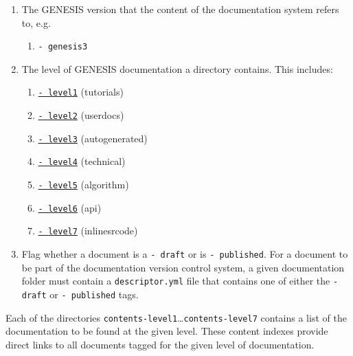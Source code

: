 \documentclass[12pt]{article}
\begin{document}
\begin{enumerate}

\item The GENESIS version that the content of the documentation system refers to, e.g.
\begin{enumerate}
\item  {\tt - genesis3}
\end{enumerate}

\item The level of GENESIS documentation a directory contains. This includes:

	\begin{enumerate}

	\item \href{../contents-level1/contents-level1.pdf}{{\tt - level1}} (tutorials)

	\item \href{../contents-level2/contents-level2.pdf}{{\tt - level2}} (userdocs)

	\item \href{../contents-level3/contents-level3.pdf}{{\tt - level3}} (autogenerated)

	\item \href{../contents-level4/contents-level4.pdf}{{\tt - level4}} (technical)

	\item \href{../contents-level5/contents-level5.pdf}{{\tt - level5}} (algorithm)

	\item \href{../contents-level6/contents-level6.pdf}{{\tt - level6}} (api)

	\item \href{../contents-level7/contents-level7.pdf}{{\tt - level7}} (inlinesrcode)

	\end{enumerate}

\item Flag whether a document is a {\tt - draft} or is {\tt - published}. For a document to be part of the documentation version control system, a given documentation folder must contain a {\tt descriptor.yml} file that contains one of either the {\tt - draft} or {\tt - published} tags.

\end{enumerate}

Each of the directories {\tt contents-level1}\ldots {\tt contents-level7} contains a list of the documentation to be found at the given level. These content indexes provide direct links to all documents tagged for the given level of documentation.
\end{document}
